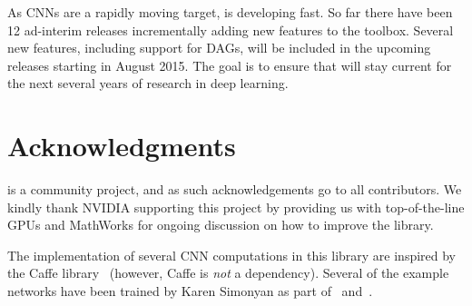 As CNNs are a rapidly moving target, \matconvnet is developing fast. So far there have been  12 ad-interim releases incrementally adding new features to the toolbox. Several new features, including support for DAGs, will be included in the upcoming releases starting in August 2015.  The goal is to ensure that \matconvnet will stay current for the next several years of research in deep learning.

\section{Acknowledgments}\label{s:ack}

\matconvnet is a community project, and as such acknowledgements go to all contributors. We kindly thank NVIDIA supporting this project by providing us with top-of-the-line GPUs and MathWorks for ongoing discussion on how to improve the library. 

The implementation of several CNN computations in this library are inspired by the Caffe library~\cite{jia13caffe} (however, Caffe is \emph{not} a dependency). Several of the example networks have been trained by Karen Simonyan as part of~\cite{chatfield14return} and~\cite{simonyan15very}.
